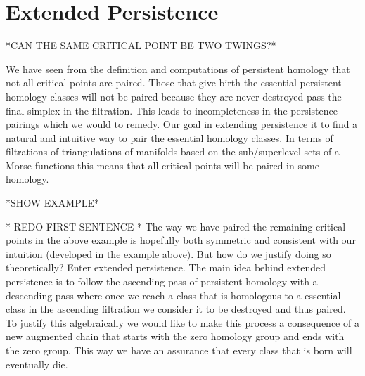 




\section{Extended Persistence}

*CAN THE SAME CRITICAL POINT BE TWO TWINGS?*

We have seen from the definition and computations of persistent homology that not all critical points are paired. Those that give birth the essential persistent homology classes will not be paired because they are never destroyed pass the final simplex in the filtration. This leads to incompleteness in the persistence pairings which we would to remedy. Our goal in extending persistence it to find a natural and intuitive way to pair the essential homology classes. In terms of filtrations of triangulations of manifolds based on the sub/superlevel sets of a Morse functions this means that all critical points will be paired in some homology.

*SHOW EXAMPLE*

* REDO FIRST SENTENCE *
The way we have paired the remaining critical points in the above example is hopefully both symmetric and consistent with our intuition (developed in the example above). But how do we justify doing so theoretically? Enter extended persistence. The main idea behind extended persistence is to follow the ascending pass of persistent homology with a descending pass where once we reach a class that is homologous to a essential class in the ascending filtration we consider it to be destroyed and thus paired. To justify this algebraically we would like to make this process a consequence of a new augmented chain that starts with the zero homology group and ends with the zero group. This way we have an assurance that every class that is born will eventually die.

